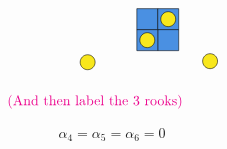 \documentclass[12pt]{article}
\begin{document}
\[\begin{tikzpicture}[x=0.75pt,y=0.75pt,yscale=-1,xscale=1]
        \draw  [fill={rgb, 255:red, 74; green, 144; blue, 226 }  ,fill opacity=1 ] (172,44.37) -- (192,44.37) -- (192,64.37) -- (172,64.37) -- cycle ;
        \draw  [fill={rgb, 255:red, 74; green, 144; blue, 226 }  ,fill opacity=1 ] (192,44.37) -- (212,44.37) -- (212,64.37) -- (192,64.37) -- cycle ;
        \draw  [fill={rgb, 255:red, 74; green, 144; blue, 226 }  ,fill opacity=1 ] (192,64.37) -- (212,64.37) -- (212,84.37) -- (192,84.37) -- cycle ;
        \draw  [fill={rgb, 255:red, 74; green, 144; blue, 226 }  ,fill opacity=1 ] (172,64.37) -- (192,64.37) -- (192,84.37) -- (172,84.37) -- cycle ;
        \draw  [fill={rgb, 255:red, 248; green, 231; blue, 28 }  ,fill opacity=1 ] (174.87,74.37) .. controls (174.87,70.43) and (178.06,67.24) .. (182,67.24) .. controls (185.94,67.24) and (189.13,70.43) .. (189.13,74.37) .. controls (189.13,78.31) and (185.94,81.5) .. (182,81.5) .. controls (178.06,81.5) and (174.87,78.31) .. (174.87,74.37) -- cycle ;
        \draw  [fill={rgb, 255:red, 248; green, 231; blue, 28 }  ,fill opacity=1 ] (194.87,54.37) .. controls (194.87,50.43) and (198.06,47.24) .. (202,47.24) .. controls (205.94,47.24) and (209.13,50.43) .. (209.13,54.37) .. controls (209.13,58.31) and (205.94,61.5) .. (202,61.5) .. controls (198.06,61.5) and (194.87,58.31) .. (194.87,54.37) -- cycle ;
        \draw  [fill={rgb, 255:red, 248; green, 231; blue, 28 }  ,fill opacity=1 ] (117.87,95.37) .. controls (117.87,91.43) and (121.06,88.24) .. (125,88.24) .. controls (128.94,88.24) and (132.13,91.43) .. (132.13,95.37) .. controls (132.13,99.31) and (128.94,102.5) .. (125,102.5) .. controls (121.06,102.5) and (117.87,99.31) .. (117.87,95.37) -- cycle ;
        \draw  [fill={rgb, 255:red, 248; green, 231; blue, 28 }  ,fill opacity=1 ] (234.87,94.37) .. controls (234.87,90.43) and (238.06,87.24) .. (242,87.24) .. controls (245.94,87.24) and (249.13,90.43) .. (249.13,94.37) .. controls (249.13,98.31) and (245.94,101.5) .. (242,101.5) .. controls (238.06,101.5) and (234.87,98.31) .. (234.87,94.37) -- cycle ;
        
        \draw (47,125) node [anchor=north west][inner sep=0.75pt]   [align=left] {\rt{(And then label the 3 rooks)}};
        
        
        \end{tikzpicture}
        \]
        \begin{align*}
            \alpha_4=\alpha_5=\alpha_6=0
        \end{align*}
\end{document}
